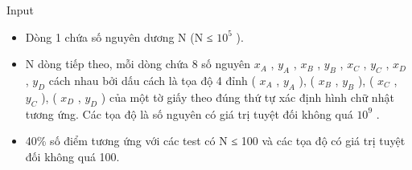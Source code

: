 Input
\begin{itemize}
	\item     Dòng 1 chứa số nguyên dương N (N ≤ $10^{5}$    ).   
	\item     N dòng tiếp theo, mỗi dòng chứa 8 số nguyên $x_{A}$    , $y_{A}$    , $x_{B}$    , $y_{B}$    , $x_{C}$    , $y_{C}$    , $x_{D}$    , $y_{D}$    cách nhau bởi dấu cách là tọa độ 4 đỉnh (         $x_{A}$     , $y_{A}$     ), (           $x_{B}$      , $y_{B}$     ), (           $x_{C}$      , $y_{C}$     ), (           $x_{D}$      , $y_{D}$     ) của một tờ giấy theo đúng thứ tự xác định hình chữ nhật tương ứng. Các tọa độ là số nguyên có giá trị tuyệt đối không quá $10^{9}$     .    
	\item      40\% số điểm tương ứng với các test có N         ≤ 100 và các tọa độ có giá trị tuyệt đối không quá 100.    
\end{itemize}
